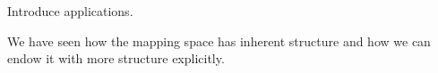 Introduce applications.

We have seen how the mapping space has inherent structure  and how we can endow it with more structure explicitly.